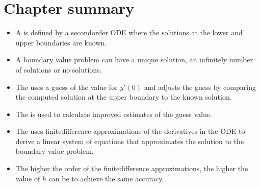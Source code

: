 \documentclass[letterpaper,10pt,english]{jupyterBook}
\begin{document}
\section{Chapter summary}
\label{\detokenize{5_BVPs/5.3_BVP_summary:chapter-summary}}\label{\detokenize{5_BVPs/5.3_BVP_summary::doc}}\begin{itemize}
\item {} 
\sphinxAtStartPar
A {\hyperref[\detokenize{5_BVPs/5.0_BVPs:bvp-definition}]{}} is defined by a second\sphinxhyphen{}order ODE where the solutions at the lower and upper boundaries are known.

\item {} 
\sphinxAtStartPar
A boundary value problem can have a unique solution, an infinitely number of solutions or no solutions.

\item {} 
\sphinxAtStartPar
The {\hyperref[\detokenize{5_BVPs/5.1_Shooting_method:shooting-method-section}]{}} uses a guess of the value for \(y'(0)\) and adjusts the guess by comparing the computed solution at the upper boundary to the known solution.

\item {} 
\sphinxAtStartPar
The {\hyperref[\detokenize{5_BVPs/5.1_Shooting_method:secant-method-section}]{}} is used to calculate improved estimates of the guess value.

\item {} 
\sphinxAtStartPar
The {\hyperref[\detokenize{5_BVPs/5.2_Finite_difference_method:finite-difference-method-section}]{}} uses finite\sphinxhyphen{}difference approximations of the derivatives in the ODE to derive a linear system of equations that approximates the solution to the boundary value problem.

\item {} 
\sphinxAtStartPar
The higher the order of the finite\sphinxhyphen{}difference approximations, the higher the value of \(h\) can be to achieve the same accuracy.

\end{itemize}

\sphinxstepscope
\end{document}
